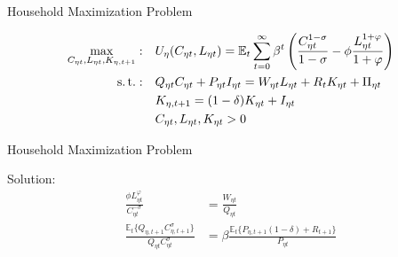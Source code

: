 \documentclass[../quali_slides.tex]{subfiles}
\begin{document}

\begin{frame}{Household Maximization Problem}
	
	\begin{align}
		\max_{C_{\eta t}, L_{\eta t}, K_{\eta,t+1}}: &\quad U_{\eta}(C_{\eta t},L_{\eta t}) = {\mathbb{E}_{t}} \sum_{t=0}^{\infty} \beta^t \left(\frac{C_{\eta t}^{1-\sigma}}{1-\sigma} - \phi \frac{L_{\eta t}^{1+\varphi}}{1+\varphi} \right) \label{eq_v2:reg-utility-function} 
		\\
		\operatorname{s.t.}: &\quad Q_{\eta t} C_{\eta t} + P_{\eta t} I_{\eta t} = W_{\eta t} L_{\eta t} + R_{t} K_{\eta t} + \Pi_{\eta t} \label{eq_v2:reg-budget-constraint} \\
		&\quad K_{\eta,t+1} = (1 - \delta) K_{\eta t} + I_{\eta t} \label{eq_v2:reg-law-of-motion-of-capital} \\
		&\quad C_{\eta t}, L_{\eta t}, K_{\eta t} > 0 \nonumber
	\end{align}
	
\end{frame}


\begin{frame}{Household Maximization Problem}
	
	Solution:
\begin{align}
	\frac{\phi L_{\eta t}^{\varphi}}{C_{\eta t}^{-\sigma}} &= \frac{W_{\eta t}}{Q_{\eta t}} \label{eq_v2:reg-labor-supply} \\
	\frac{\mathbb{E}_{t} \{ Q_{\eta,t+1} C_{\eta,t+1}^{\sigma} \} }{ Q_{\eta t} C_{\eta t}^{\sigma} } &= \beta \frac{ \mathbb{E}_{t} \{ P_{\eta,t+1} (1 - \delta) + R_{t+1} \} }{P_{\eta t}} \label{eq_v2:reg-capital-euler-equation}
\end{align}


	
\end{frame}

\end{document}
